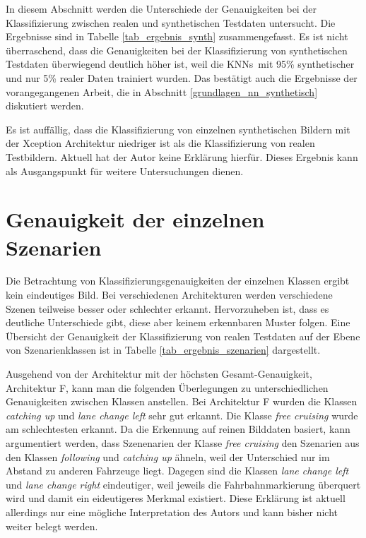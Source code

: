 In diesem Abschnitt werden die Unterschiede der Genauigkeiten bei der Klassifizierung zwischen realen und synthetischen Testdaten untersucht. Die Ergebnisse sind in Tabelle \ref{tab_ergebnis_synth} zusammengefasst. Es ist nicht überraschend, dass die Genauigkeiten bei der Klassifizierung von synthetischen Testdaten überwiegend deutlich höher ist, weil die \acp{KNN} mit 95\% synthetischer und nur 5\% realer Daten trainiert wurden. Das bestätigt auch die Ergebnisse der vorangegangenen Arbeit, die in Abschnitt \ref{grundlagen_nn_synthetisch} diskutiert werden. 

Es ist auffällig, dass die Klassifizierung von einzelnen synthetischen Bildern mit der Xception Architektur niedriger ist als die Klassifizierung von realen Testbildern. Aktuell hat der Autor keine Erklärung hierfür. Dieses Ergebnis kann als Ausgangspunkt für weitere Untersuchungen dienen.


\section{Genauigkeit der einzelnen Szenarien}
\label{ergebnis_szenarien}

Die Betrachtung von Klassifizierungsgenauigkeiten der einzelnen Klassen ergibt kein eindeutiges Bild. Bei verschiedenen Architekturen werden verschiedene Szenen teilweise besser oder schlechter erkannt. Hervorzuheben ist, dass es deutliche Unterschiede gibt, diese aber keinem erkennbaren Muster folgen. Eine Übersicht der Genauigkeit der Klassifizierung von realen Testdaten auf der Ebene von Szenarienklassen ist in Tabelle \ref{tab_ergebnis_szenarien} dargestellt.

Ausgehend von der Architektur mit der höchsten Gesamt-Genauigkeit, Architektur F, kann man die folgenden Überlegungen zu unterschiedlichen Genauigkeiten zwischen Klassen anstellen. Bei Architektur F wurden die Klassen \textit{catching up} und \textit{lane change left} sehr gut erkannt. Die Klasse \textit{free cruising} wurde am schlechtesten erkannt. Da die Erkennung auf reinen Bilddaten basiert, kann argumentiert werden, dass Szenenarien der Klasse \textit{free cruising} den Szenarien aus den Klassen \textit{following} und \textit{catching up} ähneln, weil der Unterschied nur im Abstand zu anderen Fahrzeuge liegt. Dagegen sind die Klassen \textit{lane change left} und \textit{lane change right} eindeutiger, weil jeweils die Fahrbahnmarkierung überquert wird und damit ein eideutigeres Merkmal existiert. Diese Erklärung ist aktuell allerdings nur eine mögliche Interpretation des Autors und kann bisher nicht weiter belegt werden. 

